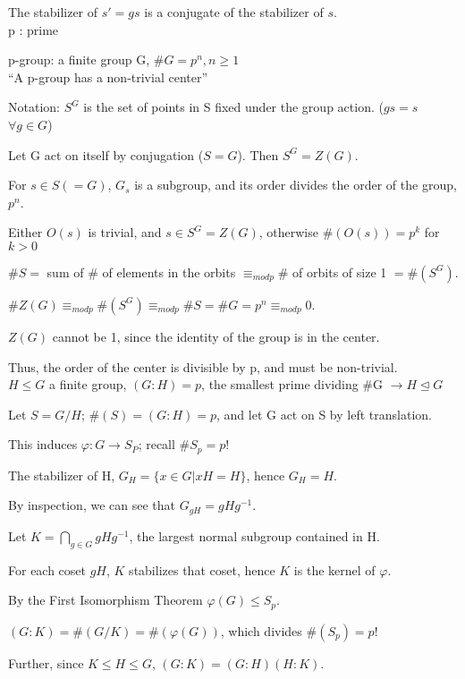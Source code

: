 \documentclass[12pt]{article}
\begin{document}
The stabilizer of $s'=gs$ is a conjugate of the stabilizer of $s$.\\


\noindent
p : prime

\noindent
p-group: a finite group G, $\#G = p^n, n \geq 1$\\

\noindent
``A p-group has a non-trivial center''

Notation: $S^G$ is the set of points in S fixed under the group action. ($gs = s$ $\forall g \in G$)

\noindent
Let G act on itself by conjugation ($S = G$).  Then $S^G = Z(G)$.

For $s \in S (= G)$, $G_s$ is a subgroup, and its order divides the order of the group, $p^n$.

Either $O(s)$ is trivial, and $s \in S^G = Z(G)$, otherwise $\#(O(s)) = p^k$ for $k > 0$

\noindent
$\#S =$ sum of \# of elements in the orbits $\equiv_{mod p} \#$ of orbits of size 1 $= \#(S^G)$.

$\#Z(G) \equiv_{mod p} \#(S^G) \equiv_{mod p} \#S = \#G = p^n \equiv_{mod p} 0$.

$Z(G)$ cannot be 1, since the identity of the group is in the center.

Thus, the order of the center is divisible by p, and must be non-trivial.\\

\noindent
$H \leq G$ a finite group, $(G : H) = p$, the smallest prime dividing \#G $\to H \trianglelefteq G$

Let $S = G\slash H$; $\#(S) = (G : H) = p$, and let G act on S by left translation.

This induces $\varphi: G \to S_P$; recall $\#S_p = p!$

The stabilizer of H, $G_H = \{x \in G | xH = H\}$, hence $G_H = H$.

By inspection, we can see that $G_{gH} = gHg^{-1}$.

Let $K = \bigcap_{g \in G}gHg^{-1}$, the largest normal subgroup contained in H.

For each coset $gH$, $K$ stabilizes that coset, hence $K$ is the kernel of $\varphi$.

By the First Isomorphism Theorem $\varphi(G) \leq S_p$.

$(G : K) = \#(G\slash K) = \#(\varphi(G))$, which divides $\#(S_p) = p!$

Further, since $K \leq H \leq G$, $(G : K) = (G : H)(H : K)$.
\end{document}
